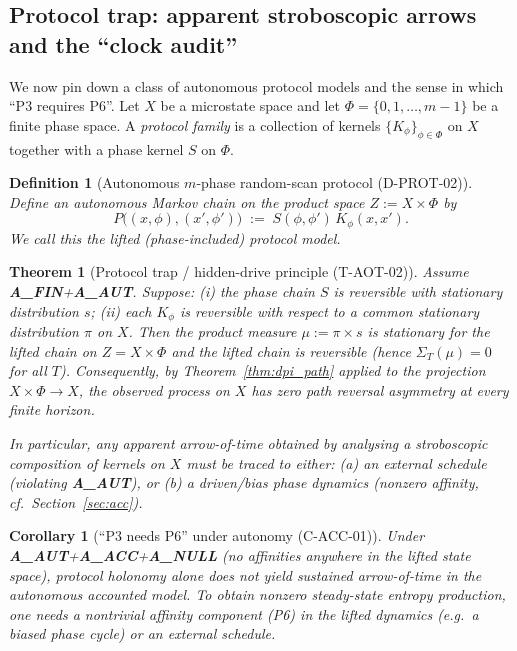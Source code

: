 \documentclass[11pt]{article}
\newtheorem{definition}{Definition}
\newtheorem{theorem}{Theorem}
\newtheorem{corollary}{Corollary}
\theoremstyle{remark}
\begin{document}
\subsection{Protocol trap: apparent stroboscopic arrows and the ``clock audit''}

We now pin down a class of autonomous protocol models and the sense in which ``P3 requires P6''.
Let $X$ be a microstate space and let $\Phi=\{0,1,\dots,m-1\}$ be a finite phase space.
A \emph{protocol family} is a collection of kernels $\{K_\phi\}_{\phi\in\Phi}$ on $X$ together with a phase kernel $S$ on $\Phi$.

\begin{definition}[Autonomous $m$-phase random-scan protocol (D-PROT-02)]
Define an autonomous Markov chain on the product space $Z:=X\times \Phi$ by
\[
P\big((x,\phi),(x',\phi')\big)\;:=\; S(\phi,\phi')\,K_\phi(x,x').
\]
We call this the \emph{lifted} (phase-included) protocol model.
\end{definition}

\begin{theorem}[Protocol trap / hidden-drive principle (T-AOT-02)]\label{thm:protocol_trap}
Assume \textbf{A\_FIN}+\textbf{A\_AUT}.
Suppose:
(i) the phase chain $S$ is reversible with stationary distribution $s$;
(ii) each $K_\phi$ is reversible with respect to a \emph{common} stationary distribution $\pi$ on $X$.
Then the product measure $\mu:=\pi\times s$ is stationary for the lifted chain on $Z=X\times\Phi$ and the lifted chain is reversible (hence $\Sigma_T(\mu)=0$ for all $T$).
Consequently, by Theorem~\ref{thm:dpi_path} applied to the projection $X\times\Phi\to X$, the observed process on $X$ has zero path reversal asymmetry at every finite horizon.

In particular, any \emph{apparent} arrow-of-time obtained by analysing a stroboscopic composition of kernels on $X$ must be traced to either:
(a) an external schedule (violating \textbf{A\_AUT}), or
(b) a driven/bias phase dynamics (nonzero affinity, cf.\ Section~\ref{sec:acc}).
\end{theorem}

\begin{corollary}[``P3 needs P6'' under autonomy (C-ACC-01)]
Under \textbf{A\_AUT}+\textbf{A\_ACC}+\textbf{A\_NULL} (no affinities anywhere in the lifted state space), protocol holonomy alone does not yield sustained arrow-of-time in the autonomous accounted model.
To obtain nonzero steady-state entropy production, one needs a nontrivial affinity component (P6) in the lifted dynamics (e.g.\ a biased phase cycle) or an external schedule.
\end{corollary}
\end{document}
